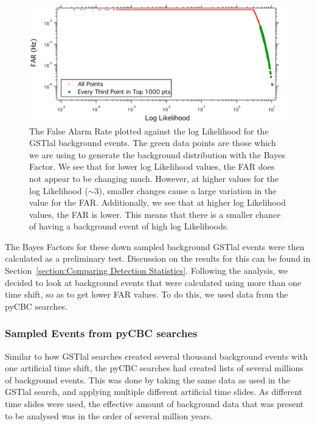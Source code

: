 \documentclass{article}
\begin{document}
  
  \begin{figure}[h]
  	\centering
  	\includegraphics[width=1\textwidth]{Figures/sampledPts.pdf} 
  	\caption{The False Alarm Rate plotted against the log Likelihood for the GSTlal background events. The green data points are those which we are using to generate the background distribution with the Bayes Factor. We see that for lower log Likelihood values, the FAR does not appear to be changing much. However, at higher values for the log Likelihood ($\sim3$), smaller changes cause a large variation in the value for the FAR. Additionally, we see that at higher log Likelihood values, the FAR is lower. This means that there is a smaller chance of having a background event of high log Likelihoods.}
  	\label{Fig:sampledPts}
  \end{figure}
  
  The Bayes Factors for these down sampled background GSTlal events were then calculated as a preliminary test. Discussion on the results for this can be found in Section~\ref{section:Comparing Detection Statistics}. Following the analysis, we decided to look at background events that were calculated using more than one time shift, so as to get lower FAR values. To do this, we used data from the pyCBC searches.  
  
  \subsubsection{Sampled Events from pyCBC searches}
  
  Similar to how GSTlal searches created several thousand background events with one artificial time shift, the pyCBC searches had created lists of several millions of background events. This was done by taking the same data as used in the GSTlal search, and applying multiple different artificial time slides. As different time slides were used, the effective amount of background data that was present to be analysed was in the order of several million years.
  
\end{document}
